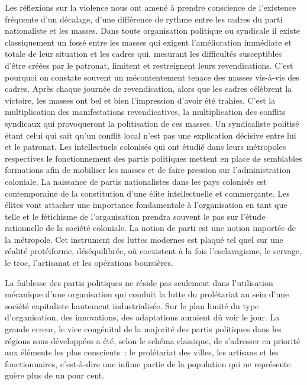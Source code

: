 \documentclass[french,twoside]{book} %
\newcommand\chaptercont{} %
\begin{document}
 
\chaptercont
\noindent Les réflexions sur la violence nous ont amené à prendre conscience de l’existence fréquente d’un décalage, d’une différence de rythme entre les cadres du parti nationaliste et les masses. Dans toute organisation politique ou syndicale il existe classiquement un fossé entre les masses qui exigent l’amélioration immédiate et totale de leur situation et les cadres qui, mesurant les difficultés susceptibles d’être créées par le patronat, limitent et restreignent leurs revendications. C’est pourquoi on constate souvent un mécontentement tenace des masses vis-à-vis des cadres. Après chaque journée de revendication, alors que les cadres célèbrent la victoire, les masses ont bel et bien l’impression d’avoir été trahies. C’est la multiplication des manifestations revendicatives, la multiplication des conflits syndicaux qui provoqueront la politisation de ces masses. Un syndicaliste politisé étant celui qui sait qu’un conflit local n’est pas une explication décisive entre lui et le patronat. Les intellectuels colonisés qui ont étudié dans leurs métropoles respectives le fonctionnement des partis politiques mettent en place de semblables formations afin de mobiliser les masses et de faire pression sur l’administration coloniale. La naissance de partis nationalistes dans les pays colonisés est contemporaine de la constitution d’une élite intellectuelle et commerçante. Les élites vont attacher une importance fondamentale à l’organisation en tant que telle et le fétichisme de l’organisation prendra souvent le pas sur l’étude rationnelle de la société coloniale. La notion de parti est une notion importée de la métropole. Cet instrument des luttes modernes est plaqué tel quel sur une réalité protéiforme,   déséquilibrée, où coexistent à la fois l’esclavagisme, le servage, le troc, l’artisanat et les opérations boursières.\par
\bigbreak
\noindent La faiblesse des partis politiques ne réside pas seulement dans l’utilisation mécanique d’une organisation qui conduit la lutte du prolétariat au sein d’une société capitaliste hautement industrialisée. Sur le plan limité du type d’organisation, des innovations, des adaptations auraient dû voir le jour. La grande erreur, le vice congénital de la majorité des partis politiques dans les régions sous-développées a été, selon le schéma classique, de s’adresser en priorité aux éléments les plus conscients : le prolétariat des villes, les artisans et les fonctionnaires, c’est-à-dire une infime partie de la population qui ne représente guère plus de un pour cent.\par
\end{document}
